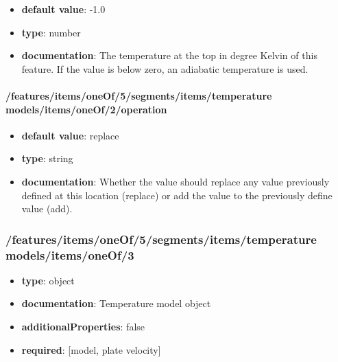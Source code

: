 \begin{itemize}\item {\bf default value}: -1.0
\item {\bf type}: number
\item {\bf documentation}: The temperature at the top in degree Kelvin of this feature. If the value is below zero, an adiabatic temperature is used.
\end{itemize}\paragraph{/features/items/oneOf/5/segments/items/temperature models/items/oneOf/2/operation}
\begin{itemize}\item {\bf default value}: replace
\item {\bf type}: string
\item {\bf documentation}: Whether the value should replace any value previously defined at this location (replace) or add the value to the previously define value (add).
\end{itemize}\subsubsection{/features/items/oneOf/5/segments/items/temperature models/items/oneOf/3}
\begin{itemize}\item {\bf type}: object
\item {\bf documentation}: Temperature model object
\item {\bf additionalProperties}: false
\item {\bf required}: [model, plate velocity]\end{itemize}
